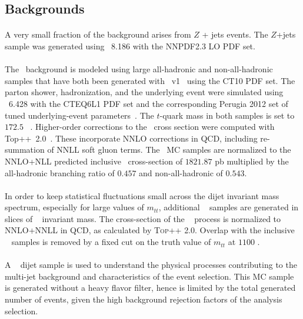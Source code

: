 \subsection{Backgrounds}
\paragraph{}
A very small fraction of the background arises from $Z$ + jets events. The $Z$+jets sample was generated using \pythia~8.186 with the NNPDF2.3 LO PDF set.

\paragraph{}
The \ttbar\ background is modeled using large all-hadronic and non-all-hadronic samples that have both been generated with \powhegbox\ v1~\cite{Alioli:2010xd} using the CT10 PDF set. 
The parton shower, hadronization, and the underlying event were simulated using \pythia~6.428 with the CTEQ6L1 PDF set and the corresponding Perugia 2012 set of tuned underlying-event parameters~\cite{Skands:2010ak}.
The $t$-quark mass in both samples is set to $172.5$ \GeV~.
Higher-order corrections to the \ttbar\ cross section were computed with Top++~2.0~\cite{Czakon:20142930}. These incorporate NNLO corrections in QCD, including re-summation of NNLL soft gluon terms.
The \ttbar\ MC samples are normalized to the NNLO+NLL predicted inclusive \ttbar\ cross-section of
$1821.87$ pb multiplied by the all-hadronic branching ratio of $0.457$ and non-all-hadronic of $0.543$.

\paragraph{}
In order to keep statistical fluctuations small across the dijet invariant mass spectrum, especially for large values of $m_{tt}$, additional \ttbar~ samples are generated in slices of \ttbar~ invariant mass. The cross-section of the \ttbar~ process is normalized to NNLO+NNLL in QCD, as calculated by \textsc{Top++} 2.0. Overlap with the inclusive \ttbar~ samples is removed by a fixed cut on the truth value of $m_{tt}$ at $1100$ \GeV.

\paragraph{}
A \pythia~ dijet sample is used to understand the physical processes contributing to the multi-jet background and characteristics of the event selection. This MC sample is generated without a heavy flavor filter, hence is limited by the total generated number of events, given the high background rejection factors of the analysis selection.

